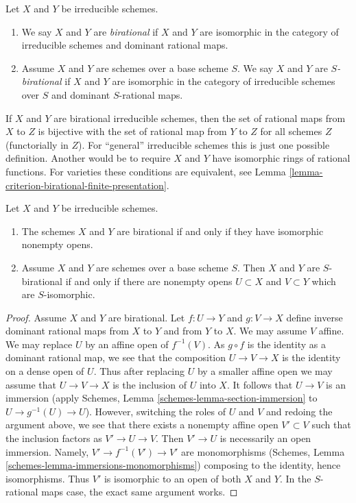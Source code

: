 \begin{definition}
\label{definition-birational-schemes}
Let $X$ and $Y$ be irreducible schemes.
\begin{enumerate}
\item We say $X$ and $Y$ are {\it birational} if $X$ and $Y$ are isomorphic
in the category of irreducible schemes and dominant rational maps.
\item Assume $X$ and $Y$ are schemes over a base scheme $S$.
We say $X$ and $Y$ are {\it $S$-birational} if $X$ and $Y$ are
isomorphic in the category of irreducible schemes over $S$ and
dominant $S$-rational maps.
\end{enumerate}
\end{definition}

\noindent
If $X$ and $Y$ are birational irreducible schemes, then the set of rational
maps from $X$ to $Z$ is bijective with the set of rational map from $Y$ to $Z$
for all schemes $Z$ (functorially in $Z$). For ``general'' irreducible schemes
this is just one possible definition. Another would be
to require $X$ and $Y$ have isomorphic rings of rational functions. For
varieties these conditions are equivalent, see
Lemma \ref{lemma-criterion-birational-finite-presentation}.

\begin{lemma}
\label{lemma-birational-integral}
Let $X$ and $Y$ be irreducible schemes.
\begin{enumerate}
\item The schemes $X$ and $Y$ are birational if and only if they have
isomorphic nonempty opens.
\item Assume $X$ and $Y$ are schemes over a base scheme $S$. Then
$X$ and $Y$ are $S$-birational if and only if there are nonempty
opens $U \subset X$ and $V \subset Y$ which are $S$-isomorphic.
\end{enumerate}
\end{lemma}

\begin{proof}
Assume $X$ and $Y$ are birational. Let $f : U \to Y$ and $g : V \to X$
define inverse dominant rational maps from $X$ to $Y$ and from $Y$ to $X$.
We may assume $V$ affine. We may replace $U$ by an affine open of $f^{-1}(V)$.
As $g \circ f$ is the identity as a dominant rational map, we see that
the composition $U \to V \to X$ is the identity on a dense open of $U$.
Thus after replacing $U$ by a smaller affine open we may assume that
$U \to V \to X$ is the inclusion of $U$ into $X$. It follows that
$U \to V$ is an immersion
(apply Schemes, Lemma \ref{schemes-lemma-section-immersion}
to $U \to g^{-1}(U) \to U$).
However, switching the roles of $U$ and $V$ and redoing the argument
above, we see that there exists a nonempty affine open $V' \subset V$
such that the inclusion factors as $V' \to U \to V$. Then $V' \to U$ is
necessarily an open immersion. Namely, $V' \to f^{-1}(V') \to V'$ are
monomorphisms
(Schemes, Lemma \ref{schemes-lemma-immersions-monomorphisms})
composing to the identity, hence isomorphisms.
Thus $V'$ is isomorphic to an open of both $X$ and $Y$.
In the $S$-rational maps case, the exact same argument works.
\end{proof}

